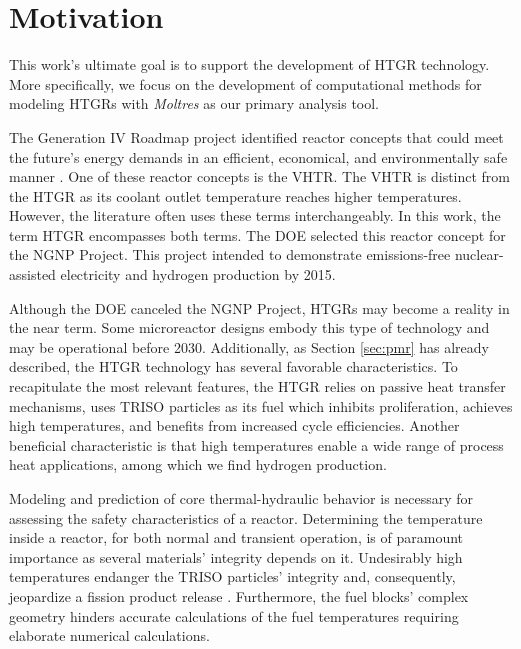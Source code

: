 \section{Motivation}

This work's ultimate goal is to support the development of \gls{HTGR} technology.
More specifically, we focus on the development of computational methods for modeling \glspl{HTGR} with \textit{Moltres} as our primary analysis tool.

The Generation IV Roadmap project identified reactor concepts that could meet the future's energy demands in an efficient, economical, and environmentally safe manner \cite{macdonald_ngnp_2003}.
One of these reactor concepts is the \gls{VHTR}.
The \gls{VHTR} is distinct from the \gls{HTGR} as its coolant outlet temperature reaches higher temperatures.
However, the literature often uses these terms interchangeably.
In this work, the term \gls{HTGR} encompasses both terms.
The \gls{DOE} selected this reactor concept for the \gls{NGNP} Project.
This project intended to demonstrate emissions-free nuclear-assisted electricity and hydrogen production by 2015.

Although the \gls{DOE} canceled the \gls{NGNP} Project, \glspl{HTGR} may become a reality in the near term.
Some microreactor designs embody this type of technology and may be operational before 2030.
Additionally, as Section \ref{sec:pmr} has already described, the \gls{HTGR} technology has several favorable characteristics.
To recapitulate the most relevant features, the \gls{HTGR} relies on passive heat transfer mechanisms, uses TRISO particles as its fuel which inhibits proliferation, achieves high temperatures, and benefits from increased cycle efficiencies.
Another beneficial characteristic is that high temperatures enable a wide range of process heat applications, among which we find hydrogen production.

Modeling and prediction of core thermal-hydraulic behavior is necessary for assessing the safety characteristics of a reactor.
Determining the temperature inside a reactor, for both normal and transient operation, is of paramount importance as several materials' integrity depends on it.
Undesirably high temperatures endanger the TRISO particles' integrity and, consequently, jeopardize a fission product release \cite{tak_numerical_2008}.
Furthermore, the fuel blocks' complex geometry hinders accurate calculations of the fuel temperatures requiring elaborate numerical calculations.

